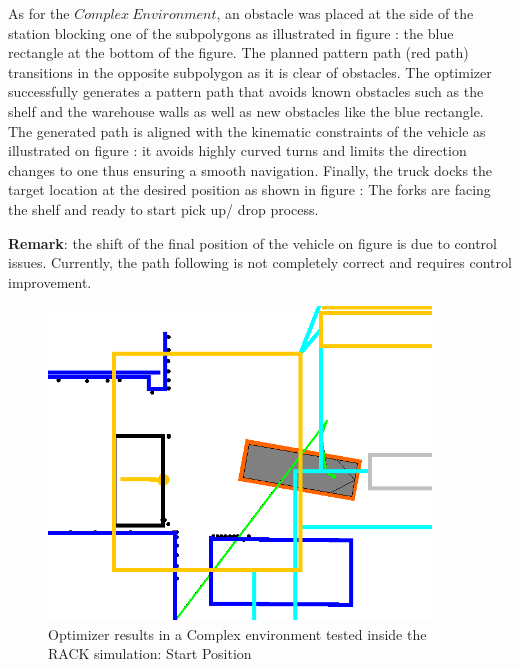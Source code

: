 As for the \(Complex~Environment\), an obstacle was placed at the side of the station 
blocking one of the subpolygons as illustrated in figure : the blue rectangle at the bottom 
of the figure.
The planned pattern path (red path) transitions in the opposite subpolygon as it is clear of obstacles.
The optimizer successfully generates a pattern path that avoids known obstacles such as the shelf and 
the warehouse walls as well as new obstacles like the blue rectangle. 
The generated path is aligned with the kinematic constraints of the vehicle as illustrated on figure : 
it avoids highly curved turns and limits the direction changes to one thus ensuring a smooth navigation.
Finally, the truck docks the target location at the desired position as shown in figure : 
The forks are facing the shelf and ready to start pick up/ drop process. 

\textbf{Remark}: the shift of the final position of the vehicle on figure  is due 
to control issues. Currently, the path following is not completely correct and requires 
control improvement.

\begin{figure}[H]
    \begin{center}
        \includegraphics[width=4in]{images/Chap3/4.png} %
        \caption{Optimizer results in a Complex environment tested inside the RACK simulation: Start Position}
        \label{OptResult6}
        \end{center}    
\end{figure}

